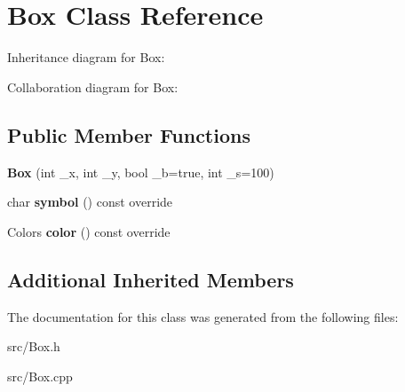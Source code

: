 \hypertarget{class_box}{}\section{Box Class Reference}
\label{class_box}


Inheritance diagram for Box\+:


Collaboration diagram for Box\+:
\subsection*{Public Member Functions}
\begin{DoxyCompactItemize}
\item 
\mbox{\label{class_box_a288ddba3646e705f5de88e410d8ed669}} 
{\bfseries Box} (int \+\_\+x, int \+\_\+y, bool \+\_\+b=true, int \+\_\+s=100)
\item 
\mbox{\label{class_box_ad15861e66cda86fe1147d1949e8e9789}} 
char {\bfseries symbol} () const override
\item 
\mbox{\label{class_box_aca81549d13a1a350a43386c2ec578b69}} 
Colors {\bfseries color} () const override
\end{DoxyCompactItemize}
\subsection*{Additional Inherited Members}


The documentation for this class was generated from the following files\+:\begin{DoxyCompactItemize}
\item 
src/Box.\+h\item 
src/Box.\+cpp\end{DoxyCompactItemize}
